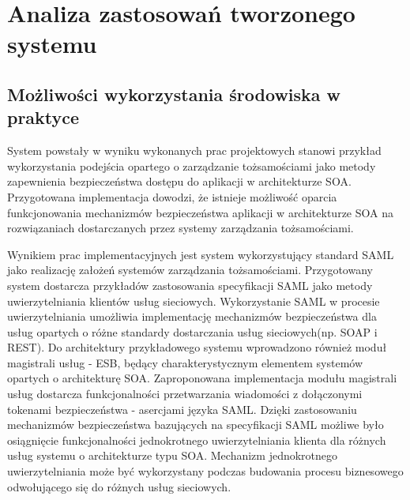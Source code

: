 \chapter{Analiza zastosowań tworzonego systemu}
\label{cha:zastosowania}


\section{Możliwości wykorzystania środowiska w praktyce}
\label{sec:wykorzystanieWPraktyce}

	System powstały w wyniku wykonanych prac projektowych stanowi przykład wykorzystania podejścia opartego o zarządzanie tożsamościami jako metody zapewnienia bezpieczeństwa dostępu do aplikacji w architekturze SOA. Przygotowana implementacja dowodzi, że  istnieje możliwość oparcia funkcjonowania mechanizmów bezpieczeństwa aplikacji w architekturze SOA na rozwiązaniach dostarczanych przez systemy zarządzania tożsamościami. 

	Wynikiem prac implementacyjnych jest system wykorzystujący standard SAML jako realizację założeń systemów zarządzania tożsamościami. Przygotowany system dostarcza przykładów zastosowania specyfikacji SAML jako metody uwierzytelniania klientów usług sieciowych. Wykorzystanie  SAML w procesie uwierzytelniania umożliwia implementację mechanizmów bezpieczeństwa dla usług opartych o różne standardy dostarczania usług sieciowych(np. SOAP i REST). Do architektury przykładowego systemu wprowadzono również moduł magistrali usług - ESB, będący charakterystycznym elementem systemów opartych o architekturę SOA. Zaproponowana implementacja modułu magistrali usług dostarcza funkcjonalności przetwarzania wiadomości z dołączonymi tokenami bezpieczeństwa - asercjami języka SAML. Dzięki zastosowaniu mechanizmów bezpieczeństwa bazujących na specyfikacji SAML możliwe było osiągnięcie funkcjonalności jednokrotnego uwierzytelniania klienta dla różnych usług systemu o architekturze typu SOA. Mechanizm jednokrotnego uwierzytelniania może być wykorzystany podczas budowania procesu biznesowego odwołującego się do różnych usług sieciowych.

